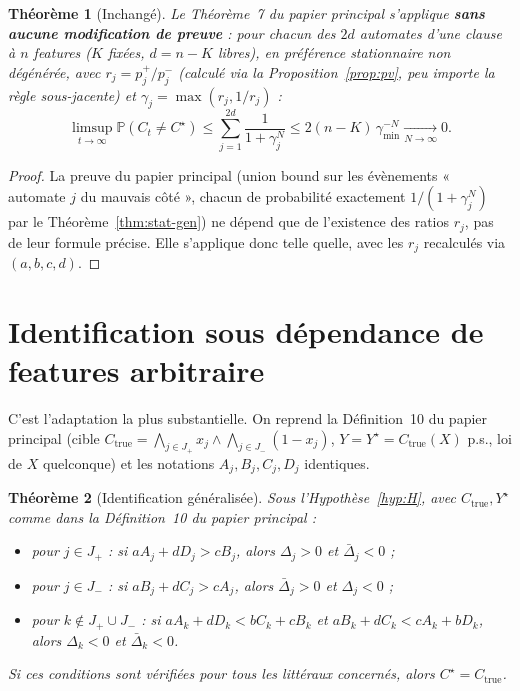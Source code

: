 \documentclass[12pt,a4paper]{article}
\newtheorem{theorem}{Théorème}[section]
\theoremstyle{remark}
\begin{document}
\begin{theorem}[Inchangé]\label{thm:multi-gen}
Le Théorème~7 du papier principal s'applique \textbf{sans aucune
modification de preuve} : pour chacun des $2d$ automates d'une clause à $n$
features ($K$ fixées, $d=n-K$ libres), en préférence stationnaire non
dégénérée, avec $r_j=p_j^+/p_j^-$ (calculé via la Proposition~\ref{prop:pv},
peu importe la règle sous-jacente) et $\gamma_j=\max(r_j,1/r_j)$ :
\[
  \limsup_{t\to\infty}\mathbb P(C_t\ne C^\star) \le \sum_{j=1}^{2d}\frac1{1+\gamma_j^N}
  \le 2(n-K)\,\gamma_{\min}^{-N} \xrightarrow[N\to\infty]{} 0.
\]
\end{theorem}

\begin{proof}
La preuve du papier principal (union bound sur les évènements « automate $j$
du mauvais côté », chacun de probabilité exactement $1/(1+\gamma_j^N)$ par le
Théorème~\ref{thm:stat-gen}) ne dépend que de l'existence des ratios $r_j$,
pas de leur formule précise. Elle s'applique donc telle quelle, avec les
$r_j$ recalculés via $(a,b,c,d)$.
\end{proof}

\section{Identification sous dépendance de features arbitraire}

C'est l'adaptation la plus substantielle. On reprend la Définition~10 du
papier principal (cible $C_{\mathrm{true}}=\bigwedge_{j\in J_+}x_j\wedge
\bigwedge_{j\in J_-}(1-x_j)$, $Y=Y^\star=C_{\mathrm{true}}(X)$ p.s., loi de
$X$ quelconque) et les notations $A_j,B_j,C_j,D_j$ identiques.

\begin{theorem}[Identification généralisée]\label{thm:identif-gen}
Sous l'Hypothèse~\ref{hyp:H}, avec $C_{\mathrm{true}},Y^\star$ comme dans la
Définition~10 du papier principal :
\begin{itemize}
  \item pour $j\in J_+$ : si $aA_j+dD_j>cB_j$, alors $\Delta_j>0$ et $\bar\Delta_j<0$ ;
  \item pour $j\in J_-$ : si $aB_j+dC_j>cA_j$, alors $\bar\Delta_j>0$ et $\Delta_j<0$ ;
  \item pour $k\notin J_+\cup J_-$ : si $aA_k+dD_k<bC_k+cB_k$ \emph{et}
  $aB_k+dC_k<cA_k+bD_k$, alors $\Delta_k<0$ et $\bar\Delta_k<0$.
\end{itemize}
Si ces conditions sont vérifiées pour tous les littéraux concernés, alors
$C^\star=C_{\mathrm{true}}$.
\end{theorem}
\end{document}

